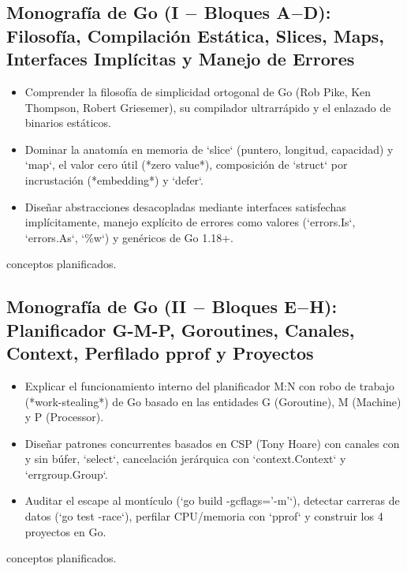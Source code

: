 \documentclass{book}
\begin{document}
\subsection*{\checkmark Monografía de Go (I \(-\) Bloques A\(-\)D): Filosofía, Compilación Estática, Slices, Maps, Interfaces Implícitas y Manejo de Errores}
\begin{itemize}
\item Comprender la filosofía de simplicidad ortogonal de Go (Rob Pike, Ken Thompson, Robert Griesemer), su compilador ultrarrápido y el enlazado de binarios estáticos.
\item Dominar la anatomía en memoria de `slice` (puntero, longitud, capacidad) y `map`, el valor cero útil (*zero value*), composición de `struct` por incrustación (*embedding*) y `defer`.
\item Diseñar abstracciones desacopladas mediante interfaces satisfechas implícitamente, manejo explícito de errores como valores (`errors.Is`, `errors.As`, `\%w`) y genéricos de Go 1.18+.
\end{itemize}
 conceptos planificados.

\subsection*{\checkmark Monografía de Go (II \(-\) Bloques E\(-\)H): Planificador G-M-P, Goroutines, Canales, Context, Perfilado pprof y Proyectos}
\begin{itemize}
\item Explicar el funcionamiento interno del planificador M:N con robo de trabajo (*work-stealing*) de Go basado en las entidades G (Goroutine), M (Machine) y P (Processor).
\item Diseñar patrones concurrentes basados en CSP (Tony Hoare) con canales con y sin búfer, `select`, cancelación jerárquica con `context.Context` y `errgroup.Group`.
\item Auditar el escape al montículo (`go build -gcflags='-m'`), detectar carreras de datos (`go test -race`), perfilar CPU/memoria con `pprof` y construir los 4 proyectos en Go.
\end{itemize}
 conceptos planificados.
\end{document}
